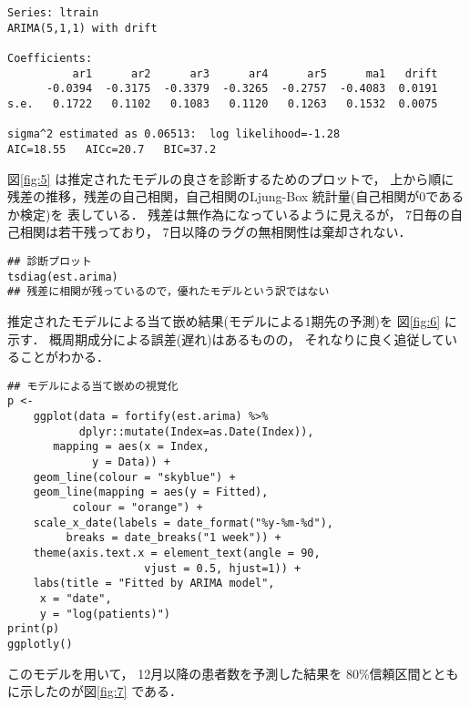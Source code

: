 \documentclass[10pt,oneside,fleqn]{scrartcl}
\begin{document}
\begin{verbatim}
Series: ltrain 
ARIMA(5,1,1) with drift 

Coefficients:
          ar1      ar2      ar3      ar4      ar5      ma1   drift
      -0.0394  -0.3175  -0.3379  -0.3265  -0.2757  -0.4083  0.0191
s.e.   0.1722   0.1102   0.1083   0.1120   0.1263   0.1532  0.0075

sigma^2 estimated as 0.06513:  log likelihood=-1.28
AIC=18.55   AICc=20.7   BIC=37.2
\end{verbatim}

図\ref{fig:5} は推定されたモデルの良さを診断するためのプロットで，
上から順に
残差の推移，残差の自己相関，自己相関のLjung-Box 統計量(自己相関が0であるか検定)を
表している．
残差は無作為になっているように見えるが，
7日毎の自己相関は若干残っており，
7日以降のラグの無相関性は棄却されない．

\begin{figure}[htbp]
  \centering
  \myGraph[1]{}
\end{figure}

\begin{verbatim}
## 診断プロット
tsdiag(est.arima)
## 残差に相関が残っているので，優れたモデルという訳ではない
\end{verbatim}

推定されたモデルによる当て嵌め結果(モデルによる1期先の予測)を
図\ref{fig:6} に示す．
概周期成分による誤差(遅れ)はあるものの，
それなりに良く追従していることがわかる．

\begin{figure}[htbp]
  \centering
  \myGraph[1]{}
\end{figure}

\begin{verbatim}
## モデルによる当て嵌めの視覚化
p <- 
    ggplot(data = fortify(est.arima) %>%
	       dplyr::mutate(Index=as.Date(Index)),
	   mapping = aes(x = Index,
			 y = Data)) +
    geom_line(colour = "skyblue") +
    geom_line(mapping = aes(y = Fitted),
	      colour = "orange") +
    scale_x_date(labels = date_format("%y-%m-%d"), 
		 breaks = date_breaks("1 week")) + 
    theme(axis.text.x = element_text(angle = 90,
				     vjust = 0.5, hjust=1)) +
    labs(title = "Fitted by ARIMA model",
	 x = "date",
	 y = "log(patients)")
print(p)
ggplotly()
\end{verbatim}

このモデルを用いて，
12月以降の患者数を予測した結果を
80\%信頼区間とともに示したのが図\ref{fig:7} である．
\end{document}

